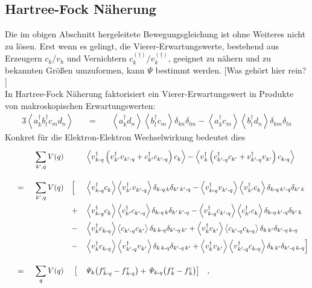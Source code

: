 \documentclass[a4paper,11pt, twoside]{article}
\newcommand{\ind}[2]{{_{#1}^{#2}}}
\newcommand{\+}{\dagger}
\newcommand{\bra}{\left \langle}
\newcommand{\ket}{\right \rangle}
\newcommand{\HF}[9]{ \bra #1 #4 \ket\bra #2 #3\ket \delta_{#5\,#8}\delta_{#6\,#7} #9 \bra #1 #3 \ket\bra #2 #4\ket \delta_{#5\, #7}\delta_{#6\, #8}}
\renewcommand{\^}{\hat}
\renewcommand{\tt}{\text}
\renewcommand{\~}{\widetilde}
\begin{document}
\subsection{Hartree-Fock Näherung}
Die im obigen Abschnitt hergeleitete Bewegungsgleichung ist ohne Weiteres nicht zu lösen. Erst wenn es gelingt, die Vierer-Erwartungswerte, bestehend aus Erzeugern $c\ind{k}{}/v\ind{k}{}$ und Vernichtern $c\ind{k}{(\+)}/v\ind{k}{(\+)}$, geeignet zu nähern und zu bekannten Größen umzuformen, kann $\mathit{\Psi}$ bestimmt werden. [Was gehört hier rein? ]\\
In Hartree-Fock Näherung faktorisiert ein Vierer-Erwartungswert in Produkte von makroskopischen Erwartungswerten: 
\begin{alignat*}{3}
\bra a\ind{k}{\+}b\ind{l}{\+}c\ind{m}{}d\ind{n}{} \ket 
&& \ = \ &&  		\bra 		a\ind{k}{\+}d\ind{n}{}			\ket		\bra 		b\ind{l}{\+}c\ind{m}{}			\ket \delta_{kn}\delta_{lm}
- 							\bra 		a\ind{k}{\+}c\ind{m}{}		\ket		\bra 		b\ind{l}{\+} d\ind{n}{}		\ket \delta_{km}\delta_{ln}				%
\end{alignat*}
Konkret für die Elektron-Elektron Wechselwirkung bedeutet dies 
\begin{alignat*}{5}
& && &&  \sum_{k',q}^{} V(q) && &&		\bra  v\ind{k\tt -q}{\+}\left (v\ind{k'}{\+}v\ind{k'\tt -q}{}+c\ind{k'}{\+}c\ind{k'\tt-q}{}\right )c\ind{k}{} 		\ket  
-  	 					\bra  v\ind{k}{\+}\left (c\ind{k'\tt -q}{\+}c\ind{k'}{}+v\ind{k'\tt-q}{\+}v\ind{k'}{}\right )c\ind{k\tt -q}{}		\ket  \\[8pt]
%
%
& && \ =\ && \sum_{k',q}^{} V(q)  &&\Big[	  &&   \HF	{   v\ind{k\tt -q}{\+}   } {   v\ind{k'}{\+}   } {   v\ind{k'\tt-q}{}  } {  c\ind{k}{}  } {k\tt -q}  {k'}  {k'\tt-q}  {k} {-}\\
& &&  && && + && 	  	 \HF{   v\ind{k\tt -q}{\+}   } {   c\ind{k'}{\+}   } {   c\ind{k'\tt-q}{}  } {  c\ind{k}{}  } {k\tt -q}  {k'}  {k'\tt-q}  {k} {-} \\[1pt]
& &&  && && - && 	  	\HF{   v\ind{k}{\+}	    	} {   c\ind{k'\tt-q}{}  }  {   c\ind{k'}{} 		 } {  c\ind{k\tt -q}{}  } {k}  {k'\tt-q}  {k'}  {k\tt-q} {+} \\[1pt]
& &&  && && - && 	  	\HF{   v\ind{k}{\+}	    	} {   v\ind{k'\tt-q}{\+}  }  {   v\ind{k'}{} 		 } {  c\ind{k\tt -q}{}  } {k}  {k'\tt-q}  {k'}  {k\tt-q} {+} \Big] \\[8pt]
%
%
& && \ =\ &&  \sum_{q}^{} V(q)&&\ \big[ && \mathit{\Psi}_{k}\big(f\ind{k\tt-q}{\tt c}-f\ind{k\tt-q}{\tt v}\big) +\mathit{\Psi}_{k\tt-q}\big(f\ind{k}{\tt v}-f\ind{k}{\tt c}\big)\big]\quad , 
\end{alignat*}
\end{document}
